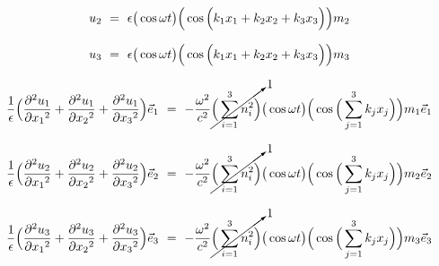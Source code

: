 \documentclass{article}
\begin{document}
\begin{equation} \label{eb-eq-1-162}
u_2 \hspace{0.125cm} = \hspace{0.125cm} \epsilon \big( \cos{ \omega t } \big) \Big( \cos \Big( k_1 x_1 + k_2 x_2 + k_3 x_3 \Big) \Big) m_2 \hspace{0.125cm} 
\end{equation}

\begin{equation} \label{eb-eq-1-163}
u_3 \hspace{0.125cm} = \hspace{0.125cm} \epsilon \big( \cos{ \omega t } \big) \Big( \cos \Big( k_1 x_1 + k_2 x_2 + k_3 x_3 \Big) \Big) m_3 \hspace{0.125cm} 
\end{equation}

\begin{equation} \label{eb-eq-1-164}
\frac{1}{\epsilon} \Big( \frac{\partial{}^2 u_1}{\partial{x_1}^2} + \frac{\partial{}^2 u_1}{\partial{x_2}^2} + \frac{\partial{}^2 u_1}{\partial{x_3}^2} \Big) \vec{e}_1 \hspace{0.125cm} = \hspace{0.125cm} - \frac{\omega{}^2}{c^2} \cancelto{1}{\Big( \sum_{i = 1}^{3} n_{i}^{2} \Big)} \big( \cos{ \omega t } \big) \Big( \cos \Big( \sum_{j = 1}^{3} k_j x_j \Big) \Big) m_1 \vec{e}_1 \hspace{0.125cm} 
\end{equation}

\begin{equation} \label{eb-eq-1-165}
\frac{1}{\epsilon}  \Big( \frac{\partial{}^2 u_2}{\partial{x_1}^2} + \frac{\partial{}^2 u_2}{\partial{x_2}^2} + \frac{\partial{}^2 u_2}{\partial{x_3}^2} \Big) \vec{e}_2 \hspace{0.125cm} = \hspace{0.125cm} - \frac{\omega{}^2}{c^2} \cancelto{1}{\Big( \sum_{i = 1}^{3} n_{i}^{2} \Big)} \big( \cos{ \omega t } \big) \Big( \cos \Big( \sum_{j = 1}^{3} k_j x_j \Big) \Big) m_2 \vec{e}_2 \hspace{0.125cm} 
\end{equation}

\begin{equation} \label{eb-eq-1-166}
\frac{1}{\epsilon} \Big( \frac{\partial{}^2 u_3}{\partial{x_1}^2} + \frac{\partial{}^2 u_3}{\partial{x_2}^2} + \frac{\partial{}^2 u_3}{\partial{x_3}^2} \Big) \vec{e}_3 \hspace{0.125cm} = \hspace{0.125cm} - \frac{\omega{}^2}{c^2} \cancelto{1}{\Big( \sum_{i = 1}^{3} n_{i}^{2} \Big)} \big( \cos{ \omega t } \big) \Big( \cos \Big( \sum_{j = 1}^{3} k_j x_j \Big) \Big) m_3 \vec{e}_3 \hspace{0.125cm} 
\end{equation}
\end{document}
